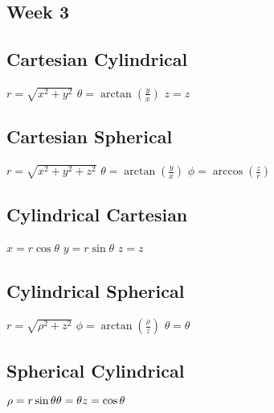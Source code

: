 \documentclass[12pt]{article}
\begin{document}
\begin{paracol}{2}
        \section*{Week 3}

        \subsection*{Cartesian \guillemotright Cylindrical}
        $r = \sqrt{x^2+y^2}$ \newline
        $\theta = \arctan(\frac{y}{x})$ \newline
        $z=z$

        \subsection*{Cartesian \guillemotright Spherical}
        $r=\sqrt{x^2+y^2+z^2}$ \newline
        $\theta = \arctan(\frac{y}{x})$ \newline
        $\phi = \arccos(\frac{z}{r})$

        \subsection*{Cylindrical \guillemotright Cartesian}
        $x = r \cos\theta$ \newline
        $y = r \sin\theta$ \newline
        $z = z$ \newline

        \switchcolumn

        \subsection*{Cylindrical \guillemotright Spherical}
        $r=\sqrt{\rho^2 + z^2}$ \newline
        $\phi = \arctan(\frac{\rho}{z})$ \newline
        $\theta = \theta$

        \subsection*{Spherical \guillemotright Cylindrical}

            $
            \rho = r \sin \theta \newline
            \theta = \theta \newline
            z = \cos \theta
            $


\end{paracol}
\end{document}
